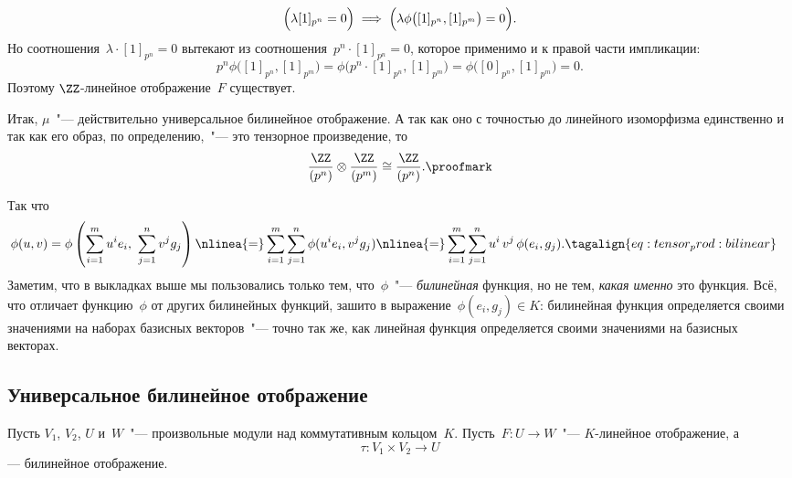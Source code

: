\begin{proofm}
\begin{description}
			\[
				\Bigl(
					\lambda [1]_{p^n} = 0
				\Bigr)
				\implies
				\Bigl(
					\lambda \phi
					\bigl(
						[1]_{p^n},
						[1]_{p^m}
					\bigr)
					= 0
				\Bigr)
				.
			\]
			Но соотношения~$\lambda \cdot [1]_{p^n} = 0$ вытекают из соотношения~$p^n \cdot [1]_{p^n} = 0$, которое применимо и к правой части импликации:
			\[
				p^n \phi
				\bigl(
					[1]_{p^n},
					[1]_{p^m}
				\bigr)
				=
				\phi
				\bigl(
					p^n
					\cdot
					[1]_{p^n},
					[1]_{p^m}
				\bigr)
				=
				\phi
				\bigl(
					[0]_{p^n},
					[1]_{p^m}
				\bigr)
				=
				0
				.
			\]
			Поэтому $\ZZ$-линейное отображение~$F$ существует.
	\end{description}

	Итак, $\mu$~"--- действительно универсальное билинейное отображение. А так как оно с точностью до линейного изоморфизма единственно и так как его образ, по определению,~"--- это тензорное произведение, то
	\[
		\frac{\ZZ}{(p^n)}
		\otimes
		\frac{\ZZ}{(p^m)}
		\cong
		\frac{\ZZ}{(p^n)}
		.
		\proofmark
	\]
\end{proofm}












\iffalse


\clearpage

Так что
\begin{align*}
	\phi(u, v) &=
	\phi
	\left( 
		\sum_{i = 1}^m u^i e_i,
		\ 
		\sum_{j = 1}^n v^j g_j
	\right)
	\nlinea{=}
	\sum_{i = 1}^m
	\sum_{j = 1}^n
	\phi
	(
		u^i e_i,
		v^j g_j
	)
	\nlinea{=}
	\sum_{i = 1}^m
	\sum_{j = 1}^n
	u^i\,
	v^j\,
	\phi
	(e_i, g_j)
	.
	\tagalign{eq:tensor_prod:bilinear}
\end{align*}
Заметим, что в выкладках выше мы пользовались только тем, что~$\phi$~"--- \emph{билинейная} функция, но не тем, \emph{какая именно} это функция. Всё, что отличает функцию~$\phi$ от других билинейных функций, зашито в выражение~$\phi(e_i, g_j) \in K$: билинейная функция определяется своими значениями на наборах базисных векторов~"--- точно так же, как линейная функция определяется своими значениями на базисных векторах.

\subsection{Универсальное билинейное отображение}

Пусть $V_1$, $V_2$, $U$ и~$W$~"--- произвольные модули над коммутативным кольцом~$K$. Пусть~$F \colon U \to W$~"--- $K$-линейное отображение, а
\begin{equation}
	\label{eq:tensor_prod:bilinear:tau:universal}
	\tau \colon
	V_1 \times V_2
	\to
	U
\end{equation}
--- билинейное отображение.

